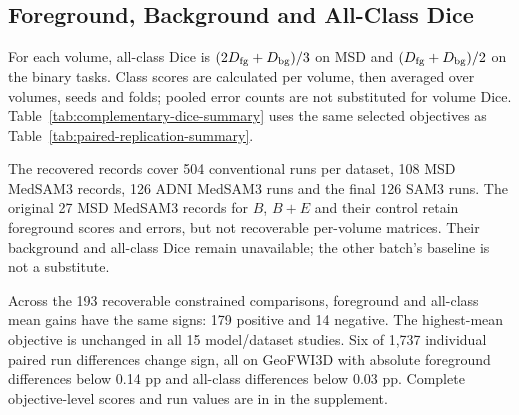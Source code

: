 \documentclass[12pt,a4paper]{article}
\begin{document}
\subsection{Foreground, Background and All-Class Dice}
\label{sec:metric-sensitivity-details}
For each volume, all-class Dice is $(2D_{\rm fg}+D_{\rm bg})/3$ on
MSD and $(D_{\rm fg}+D_{\rm bg})/2$ on the binary tasks. Class scores
are calculated per volume, then averaged over volumes, seeds and folds;
pooled error counts are not substituted for volume Dice.
Table~\ref{tab:complementary-dice-summary} uses the same selected
objectives as Table~\ref{tab:paired-replication-summary}.

The recovered records cover 504 conventional runs per dataset, 108 MSD
MedSAM3 records, 126 ADNI MedSAM3 runs and the final 126 SAM3 runs.
The original 27 MSD MedSAM3 records for $B$, $B+E$ and their control
retain foreground scores and errors, but not recoverable per-volume
matrices. Their background and all-class Dice remain unavailable;
the other batch's baseline is not a substitute.

Across the 193 recoverable constrained comparisons, foreground and
all-class mean gains have the same signs: 179 positive and 14 negative.
The highest-mean objective is unchanged in all 15 model/dataset studies.
Six of 1,737 individual paired run differences change sign, all on
GeoFWI3D with absolute foreground differences below 0.14 pp and
all-class differences below 0.03 pp. Complete objective-level scores
and run values are in  in the supplement.
\end{document}
